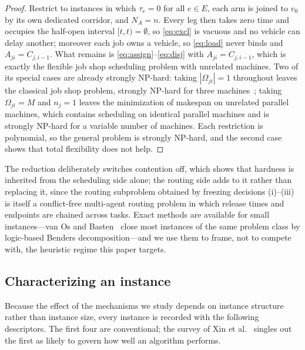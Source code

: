\documentclass[manuscript,screen,review]{acmart}
\begin{document}
\begin{proof}
Restrict to instances in which $\tau_e=0$ for all $e\in E$, each arm is joined
to $v_0$ by its own dedicated corridor, and $N_A=n$. Every leg then takes zero
time and occupies the half-open interval $[t,t)=\emptyset$, so \eqref{eq:excl}
is vacuous and no vehicle can delay another; moreover each job owns a vehicle,
so \eqref{eq:load} never binds and $A_{ji}=C_{j,i-1}$. What remains
is \eqref{eq:assign}--\eqref{eq:disj} with $A_{ji}=C_{j,i-1}$, which is exactly
the flexible job shop scheduling problem with unrelated machines. Two of its
special cases are already strongly NP-hard: taking $|\Omega_{ji}|=1$ throughout
leaves the classical job shop problem, strongly NP-hard for three
machines~\cite{garey1976complexity}; taking $\Omega_{ji}=M$ and $n_j=1$ leaves
the minimization of makespan on unrelated parallel machines, which contains
scheduling on identical parallel machines and is strongly NP-hard for a variable
number of machines. Each restriction is polynomial, so the general problem is
strongly NP-hard, and the second case shows that total flexibility does not
help.
\end{proof}

The reduction deliberately switches contention off, which shows that hardness is
inherited from the scheduling side alone; the routing side adds to it rather
than replacing it, since the routing subproblem obtained by freezing decisions
(i)--(iii) is itself a conflict-free multi-agent routing problem in which
release times and endpoints are chained across tasks. Exact methods are
available for small instances---van Os and Basten~\cite{vanos2026exact} close
most instances of the same problem class by logic-based Benders
decomposition---and we use them to frame, not to compete with, the heuristic
regime this paper targets.

\subsection{Characterizing an instance}
\label{sec:features}

Because the effect of the mechanisms we study depends on instance structure
rather than instance size, every instance is recorded with the following
descriptors. The first four are conventional; the survey of
Xin et al.~\cite{xin2025review} singles out the first as likely to govern how
well an algorithm performs.
\end{document}
